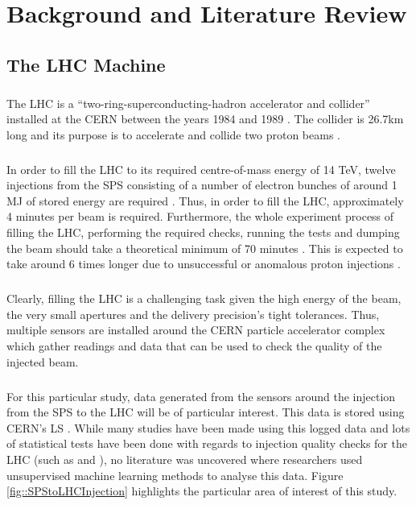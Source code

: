 \chapter{Background and Literature Review}
\section{The LHC Machine}
\paragraph{ }The \ac{LHC} is a ``two-ring-superconducting-hadron accelerator and collider'' installed at the \ac{CERN} between the years 1984 and 1989 \cite{Evans2008}. The collider is 26.7km long and its purpose is to accelerate and collide two proton beams \cite{Valentino2017}.

\paragraph{ }In order to fill the \acs{LHC} to its required centre-of-mass energy of 14 \ac{TeV}, twelve injections from the \ac{SPS} consisting of a number of electron bunches of around 1 \ac{MJ} of stored energy are required \cite{Drosdal2011}. Thus, in order to fill the \acs{LHC}, approximately 4 minutes per beam is required. Furthermore, the whole experiment process of filling the LHC, performing the required checks, running the tests and dumping the beam should take a theoretical minimum of 70 minutes \cite{Evans2008}. This is expected to take around 6 times longer due to unsuccessful or anomalous proton injections \cite{Evans2008}. 

\paragraph{ }Clearly, filling the \acs{LHC} is a challenging task given the high energy of the beam, the very small apertures and the delivery precision's tight tolerances. Thus, multiple sensors are installed around the \acs{CERN} particle accelerator complex \cite{Lefevre2008} which gather readings and data that can be used to check the quality of the injected beam. 

\paragraph{ }  For this particular study, data generated from the sensors around the injection from the \acs{SPS} to the \acs{LHC} will be of particular interest. This data is stored using \acs{CERN}'s \ac{LS} \cite{Roderick2013}. While many studies have been made using this logged data and lots of statistical tests have been done with regards to injection quality checks for the \acs{LHC} (such as \cite{Drosdal2011} and \cite{Kain2010}), no literature was uncovered where researchers used unsupervised machine learning methods to analyse this data. Figure \ref{fig::SPStoLHCInjection} highlights the particular area of interest of this study.

